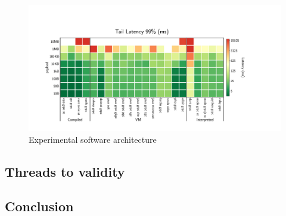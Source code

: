 \begin{figure}[!hbt]
    \begin{center}
        \includegraphics[width=1.2\linewidth]{imgs/tail99_payload}
    \end{center}
    \caption{Experimental software architecture}\label{fig:tail99_payload}
\end{figure}


\subsection{Threads to validity}



\subsection{Conclusion}
